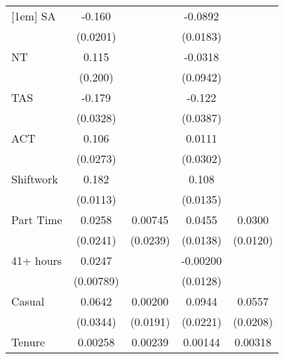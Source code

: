 {\begin{tabular}{l*{4}{c}}
[1em]
SA                  &      -0.160\sym{***}&                     &     -0.0892\sym{***}&                     \\
                    &    (0.0201)         &                     &    (0.0183)         &                     \\
[1em]
NT                  &       0.115         &                     &     -0.0318         &                     \\
                    &     (0.200)         &                     &    (0.0942)         &                     \\
[1em]
TAS                 &      -0.179\sym{***}&                     &      -0.122\sym{**} &                     \\
                    &    (0.0328)         &                     &    (0.0387)         &                     \\
[1em]
ACT                 &       0.106\sym{***}&                     &      0.0111         &                     \\
                    &    (0.0273)         &                     &    (0.0302)         &                     \\
[1em]
Shiftwork           &       0.182\sym{***}&                     &       0.108\sym{***}&                     \\
                    &    (0.0113)         &                     &    (0.0135)         &                     \\
[1em]
Part Time           &      0.0258         &     0.00745         &      0.0455\sym{**} &      0.0300\sym{*}  \\
                    &    (0.0241)         &    (0.0239)         &    (0.0138)         &    (0.0120)         \\
[1em]
41+ hours           &      0.0247\sym{**} &                     &    -0.00200         &                     \\
                    &   (0.00789)         &                     &    (0.0128)         &                     \\
[1em]
Casual              &      0.0642         &     0.00200         &      0.0944\sym{***}&      0.0557\sym{**} \\
                    &    (0.0344)         &    (0.0191)         &    (0.0221)         &    (0.0208)         \\
[1em]
Tenure              &     0.00258\sym{*}  &     0.00239\sym{**} &     0.00144         &     0.00318\sym{**} \\

\end{tabular}}
